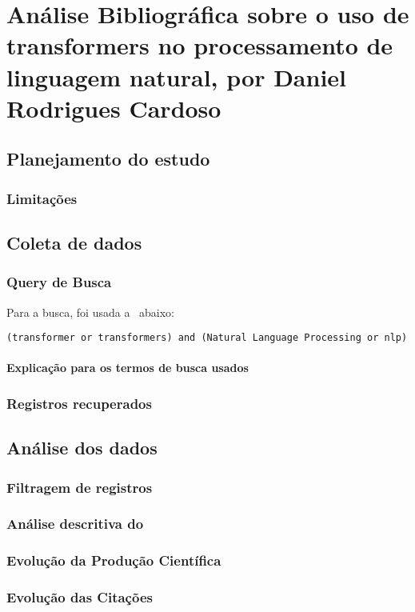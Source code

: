 \chapter{Análise Bibliográfica sobre o uso de transformers no processamento de linguagem natural, por Daniel Rodrigues Cardoso}

\section{Planejamento do estudo}

\subsection{Limitações}

\section{Coleta de dados}

\subsection{Query de Busca}
Para a busca, foi usada a \query\ abaixo:
\begin{verbatim}
(transformer or transformers) and (Natural Language Processing or nlp)
\end{verbatim}
\subsubsection{Explicação para os termos de busca usados}

\subsection{Registros recuperados}

\section{Análise dos dados}

\subsection{Filtragem de registros}

\subsection{Análise descritiva do \dataset\   }

\subsection{Evolução da Produção Científica}

\subsection{Evolução das Citações}

